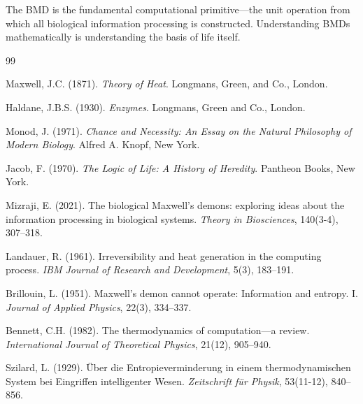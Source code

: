 \documentclass[11pt]{article}
\theoremstyle{remark}
\begin{document}
The BMD is the fundamental computational primitive—the unit operation from which all biological information processing is constructed. Understanding BMDs mathematically is understanding the basis of life itself.


\begin{thebibliography}{99}

Maxwell, J.C. (1871). \textit{Theory of Heat}. Longmans, Green, and Co., London.

Haldane, J.B.S. (1930). \textit{Enzymes}. Longmans, Green and Co., London.

Monod, J. (1971). \textit{Chance and Necessity: An Essay on the Natural Philosophy of Modern Biology}. Alfred A. Knopf, New York.

Jacob, F. (1970). \textit{The Logic of Life: A History of Heredity}. Pantheon Books, New York.

Mizraji, E. (2021). The biological Maxwell's demons: exploring ideas about the information processing in biological systems. \textit{Theory in Biosciences}, 140(3-4), 307--318.

Landauer, R. (1961). Irreversibility and heat generation in the computing process. \textit{IBM Journal of Research and Development}, 5(3), 183--191.

Brillouin, L. (1951). Maxwell's demon cannot operate: Information and entropy. I. \textit{Journal of Applied Physics}, 22(3), 334--337.

Bennett, C.H. (1982). The thermodynamics of computation—a review. \textit{International Journal of Theoretical Physics}, 21(12), 905--940.

Szilard, L. (1929). Über die Entropieverminderung in einem thermodynamischen System bei Eingriffen intelligenter Wesen. \textit{Zeitschrift für Physik}, 53(11-12), 840--856.

\end{thebibliography}
\end{document}
